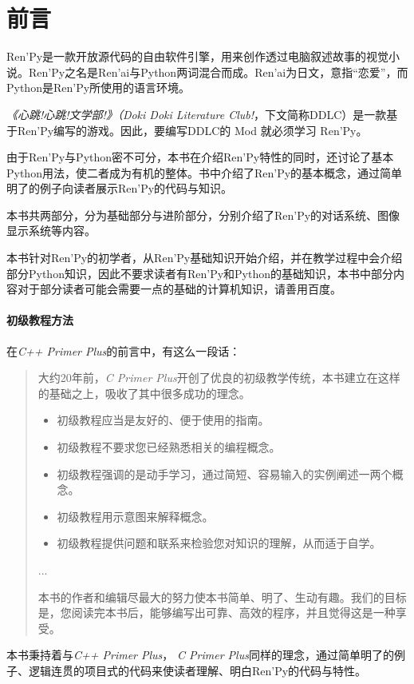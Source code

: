 \documentclass[../Main.tex]{subfiles}
\begin{document}
\clearpage
{}
\chapter{前言}
Ren'Py是一款开放源代码的自由软件引擎，用来创作透过电脑叙述故事的视觉小说。Ren'Py之名是Ren'ai与Python两词混合而成。Ren'ai为日文，意指“恋爱”，而Python是Ren'Py所使用的语言环境。

{\itshape 《心跳!心跳!文学部!》（Doki Doki Literature Club!}，下文简称DDLC）是一款基于Ren'Py编写的游戏。因此，要编写DDLC的 Mod 就必须学习 Ren'Py。

由于Ren'Py与Python密不可分，本书在介绍Ren'Py特性的同时，还讨论了基本Python用法，使二者成为有机的整体。书中介绍了Ren'Py的基本概念，通过简单明了的例子向读者展示Ren'Py的代码与知识。

本书共两部分，分为基础部分与进阶部分，分别介绍了Ren'Py的对话系统、图像显示系统等内容。

本书针对Ren'Py的初学者，从Ren'Py基础知识开始介绍，并在教学过程中会介绍部分Python知识，因此不要求读者有Ren'Py和Python的基础知识，本书中部分内容对于部分读者可能会需要一点的基础的计算机知识，请善用百度。


\subsubsection*{初级教程方法}
在{\itshape C++ Primer Plus}的前言中，有这么一段话：
\begin{quotation}
    大约20年前，{\itshape C Primer Plus}开创了优良的初级教学传统，本书建立在这样的基础之上，吸收了其中很多成功的理念。
    \begin{itemize}
        \item 初级教程应当是友好的、便于使用的指南。
        \item 初级教程不要求您已经熟悉相关的编程概念。
        \item 初级教程强调的是动手学习，通过简短、容易输入的实例阐述一两个概念。
        \item 初级教程用示意图来解释概念。
        \item 初级教程提供问题和联系来检验您对知识的理解，从而适于自学。
    \end{itemize}
    ...

    本书的作者和编辑尽最大的努力使本书简单、明了、生动有趣。我们的目标是，您阅读完本书后，能够编写出可靠、高效的程序，并且觉得这是一种享受。
\end{quotation}
本书秉持着与{\itshape C++ Primer Plus}， {\itshape C Primer Plus}同样的理念，通过简单明了的例子、逻辑连贯的项目式的代码来使读者理解、明白Ren'Py的代码与特性。
\end{document}
